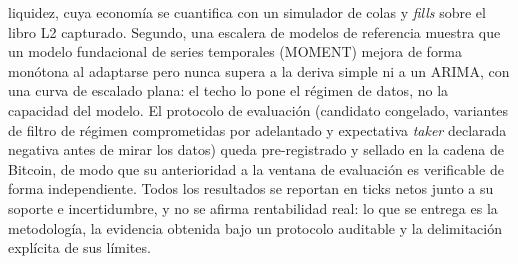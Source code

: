 liquidez, cuya economía se cuantifica con un simulador de colas y \emph{fills} sobre el
libro L2 capturado. Segundo, una escalera de modelos de referencia muestra que un modelo
fundacional de series temporales (MOMENT) mejora de forma monótona al adaptarse pero nunca
supera a la deriva simple ni a un ARIMA, con una curva de escalado plana: el techo lo pone
el régimen de datos, no la capacidad del modelo. El protocolo de evaluación (candidato
congelado, variantes de filtro de régimen comprometidas por adelantado y expectativa \emph{taker}
declarada negativa antes de mirar los datos) queda pre-registrado y sellado en la cadena de
Bitcoin, de modo que su anterioridad a la ventana de evaluación es verificable de forma
independiente. Todos los resultados se reportan
en ticks netos junto a su soporte e incertidumbre, y no se afirma rentabilidad real: lo que
se entrega es la metodología, la evidencia obtenida bajo un protocolo auditable y la
delimitación explícita de sus límites.
